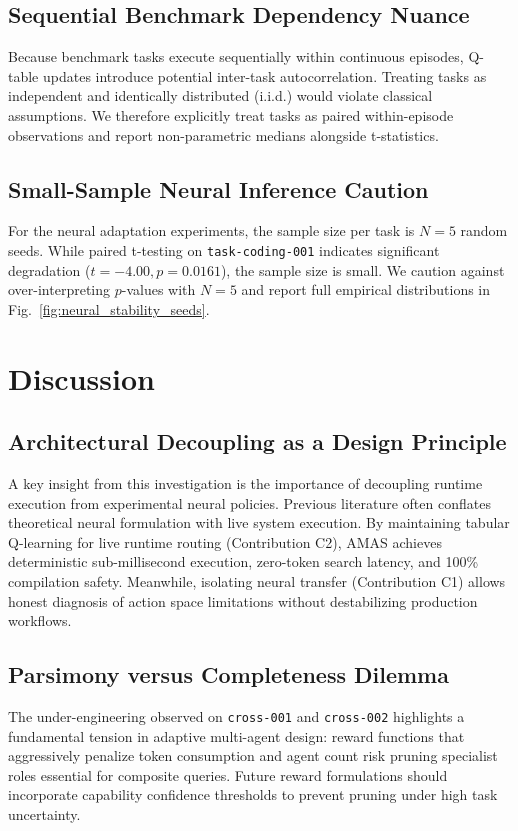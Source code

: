 \documentclass[conference]{IEEEtran}
\begin{document}
\subsection{Sequential Benchmark Dependency Nuance}
Because benchmark tasks execute sequentially within continuous episodes, Q-table updates introduce potential inter-task autocorrelation. Treating tasks as independent and identically distributed (i.i.d.) would violate classical assumptions. We therefore explicitly treat tasks as paired within-episode observations and report non-parametric medians alongside t-statistics.

\subsection{Small-Sample Neural Inference Caution}
For the neural adaptation experiments, the sample size per task is $N = 5$ random seeds. While paired t-testing on \texttt{task-coding-001} indicates significant degradation ($t = -4.00, p = 0.0161$), the sample size is small. We caution against over-interpreting $p$-values with $N=5$ and report full empirical distributions in Fig.~\ref{fig:neural_stability_seeds}.

\section{Discussion}
\label{sec:discussion}

\subsection{Architectural Decoupling as a Design Principle}
A key insight from this investigation is the importance of decoupling runtime execution from experimental neural policies. Previous literature often conflates theoretical neural formulation with live system execution. By maintaining tabular Q-learning for live runtime routing (Contribution C2), AMAS achieves deterministic sub-millisecond execution, zero-token search latency, and 100\% compilation safety. Meanwhile, isolating neural transfer (Contribution C1) allows honest diagnosis of action space limitations without destabilizing production workflows.

\subsection{Parsimony versus Completeness Dilemma}
The under-engineering observed on \texttt{cross-001} and \texttt{cross-002} highlights a fundamental tension in adaptive multi-agent design: reward functions that aggressively penalize token consumption and agent count risk pruning specialist roles essential for composite queries. Future reward formulations should incorporate capability confidence thresholds to prevent pruning under high task uncertainty.
\end{document}
